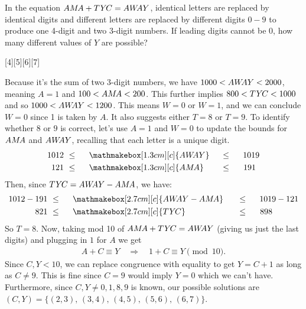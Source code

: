 \begin{problem}
    In the equation $A\mkern0mu M\mkern-2mu A + T\mkern1mu Y\mkern-2mu C= A\mkern0mu W\mkern-4mu A\mkern0mu Y$, identical letters are replaced by identical digits and different letters are replaced by different digits $0-9$ to produce one 4-digit and two 3-digit numbers. If leading digits cannot be $0$, how many different values of $Y$ are possible?
\end{problem}
[4][5][6][7]



\begin{solution}[A]
    Because it's the sum of two 3-digit numbers, we have $1000<A\mkern0mu W\mkern-4mu A\mkern0mu Y<2000$, meaning $A=1$ and $100<A\mkern0mu M\mkern-2mu A<200$. This further implies $800<T\mkern1mu Y\mkern-2mu C<1000$ and so $1000<A\mkern0mu W\mkern-4mu A\mkern0mu Y<1200$. This means $W=0$ or $W=1$, and we can conclude $W=0$ since 1 is taken by $A$. It also suggests either $T=8$ or $T=9$. To identify whether $8$ or $9$ is correct, let's use $A=1$ and $W=0$ to update the bounds for $A\mkern0mu M\mkern-2mu A$ and $A\mkern0mu W\mkern-4mu A\mkern0mu Y$, recalling that each letter is a unique digit.
    \begin{alignat*}{7}
        1012\ &\leq& \ \ &\mathmakebox[1.3cm][c]{\AWAY}& \ &\leq& \ \ 1019 \\
         121\ &\leq& \ \ &\mathmakebox[1.3cm][c]{\AMA}& \ &\leq& \ \ 191 \; \,
    \end{alignat*}
    Then, since $T\mkern1mu Y\mkern-2mu C = A\mkern0mu W\mkern-4mu A\mkern0mu Y - A\mkern0mu M\mkern-2mu A$, we have:
    \begin{alignat*}{7}
        1012 - 191 \ &\leq& \ \ &\mathmakebox[2.7cm][c]{\AWAY - \AMA}& \ &\leq& \ \ 1019 - 121\\
              821 \ &\leq& \ &\mathmakebox[2.7cm][c]{\TYC}& \ \ &\leq& \ \ 898 \qquad \quad \,
    \end{alignat*}
    So $T=8$. Now, taking mod 10 of $A\mkern0mu M\mkern-2mu A + T\mkern1mu Y\mkern-2mu C = A\mkern0mu W\mkern-4mu A\mkern0mu Y$ (giving us just the last digits) and plugging in $1$ for $A$ we get
    \begin{align*}
        A + C \equiv Y \quad \Rightarrow \quad
        1 + C \equiv Y \pmod{\!10}\text{.}
    \end{align*}
    Since $C,Y<10$, we can replace congruence with equality to get $Y=C+1$ as long as $C\neq9$. This is fine since $C=9$ would imply $Y=0$ which we can't have. Furthermore, since $C,Y \neq 0,1,8,9$ is known, our possible solutions are $(C,Y)=\{(2,3),\, (3,4),\, (4,5),\, (5,6),\, (6,7)\}$.
    

\end{solution}

